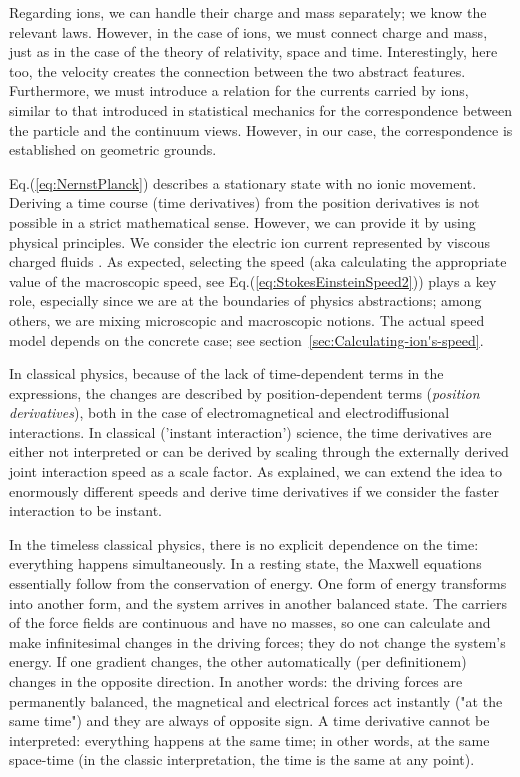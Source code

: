 Regarding ions, we can handle their charge and mass separately; we know the relevant laws. However,
in the case of ions, we must connect charge and mass, just as in the case of the theory of relativity, space and time. Interestingly,
here too, the velocity creates the connection between the two abstract features. Furthermore, we must introduce a relation for the currents carried by ions, similar to that introduced in statistical mechanics for the correspondence between the particle and the continuum views. However, in our case, the correspondence is established on geometric grounds.


Eq.(\ref{eq:NernstPlanck}) describes a stationary state with no ionic
movement. Deriving a time course (\hypertarget{NernstPlanckTimeDerivatives}{time derivatives}) from the position
derivatives is not possible in a strict mathematical sense. However,
we can provide it by using physical principles.
We consider the electric ion current represented by viscous charged
fluids \cite{ViscousChargedFluids:2014}. As expected, selecting the
speed (aka calculating the appropriate value of the macroscopic speed, see Eq.(\ref{eq:StokesEinsteinSpeed2}))
plays a key role, especially since we are at the boundaries of physics
abstractions; among others, we are mixing microscopic and macroscopic
notions. The actual speed model depends on the concrete case; see
section~\ref{sec:Calculating-ion's-speed}.


In classical
physics, because of the lack of time-dependent terms in the expressions,
the changes are described by position-dependent terms (\emph{position
derivatives}), both in the case of electromagnetical and electrodiffusional
interactions. In classical ('instant interaction') science, the
time derivatives are either not interpreted or can be derived by scaling through
the externally derived joint interaction speed as a scale factor. As explained, we can
extend the idea to enormously different speeds and derive time derivatives
if we consider the faster interaction to be instant.


In the timeless classical physics, there is no explicit dependence on
the time: everything happens simultaneously. In a resting state, the
Maxwell equations essentially follow from the conservation of energy.
One form of energy transforms into another form, and the system arrives
in another balanced state. The carriers of the force fields are continuous and have no masses,
so one can calculate and make infinitesimal changes in the driving
forces; they do not change the system's energy. If one gradient changes,
the other automatically (per definitionem) changes in the opposite direction. In another
words: the driving forces are permanently balanced, the magnetical and
electrical forces act instantly ("at the same time") and they are
always of opposite sign. A time derivative cannot be interpreted:
everything happens at the same time; in other words, at the same space-time
(in the classic interpretation, the time is the same at any point).

